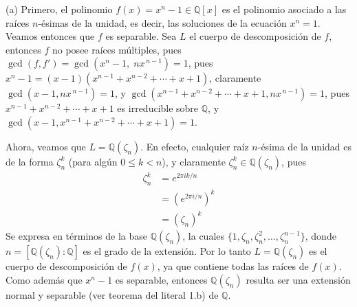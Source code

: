 \begin{solucion}
\newcommand{\Gal}{\mathrm{Gal}}
\noindent (a) Primero, el polinomio $f(x)=x^n - 1 \in \mathbb Q[x]$  es el polinomio asociado a las raíces $n$-ésimas de la unidad, es decir, las soluciones de la ecuación $x^n=1$. Veamos entonces que $f$ es separable. Sea $L$ el cuerpo de descomposición de $f$, entonces $f$ no posee raíces múltiples, pues $\gcd(f, f') = \gcd(x^n-1,\; nx^{\,n-1}) = 1$, pues $x^n-1= (x-1)(x^{n-1}+x^{n-2}+\cdots+x+1)$, claramente $\gcd(x-1, nx^{\,n-1})=1$, y $\gcd(x^{n-1}+x^{n-2}+\cdots+x+1, nx^{\,n-1})=1$, pues $x^{n-1}+x^{n-2}+\cdots+x+1$ es irreducible sobre $\mathbb Q$, y $\gcd(x-1, x^{n-1}+x^{n-2}+\cdots+x+1)=1$.

Ahora, veamos que $L = \mathbb Q(\zeta_n)$. En efecto, cualquier raíz $n$-ésima de la unidad es de la forma $\zeta_n^k$ (para algún $0\le k < n$), y claramente $\zeta_n^k \in \mathbb Q(\zeta_n)$, pues 
\begin{align*}
    \zeta_n^k &= e^{2\pi i k/n} \\
    &= \left(
        e^{2\pi i/n}
     \right)^k\\
    &=\left(\zeta_n\right)^k
\end{align*}
Se expresa en términos de la base $\mathbb Q(\zeta_n)$, la cuales $\{1, \zeta_n, \zeta_n^2, \ldots, \zeta_n^{n-1}\}$, donde $n = [\mathbb Q(\zeta_n):\mathbb Q]$ es el grado de la extensión. Por lo tanto $L = \mathbb Q(\zeta_n)$ es el cuerpo de descomposición de $f(x)$, ya que contiene todas las raíces de $f(x)$. Como además que $x^n-1$ es separable, entonces $\mathbb Q(\zeta_n)$ resulta ser una extensión normal y separable (ver teorema del literal 1.b) de $\mathbb Q$.
\end{solucion}